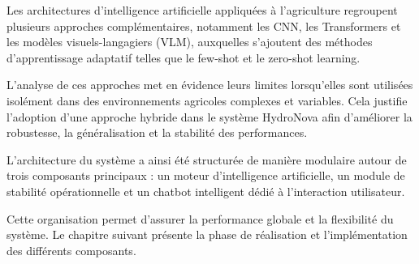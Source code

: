 Les architectures d’intelligence artificielle appliquées à l’agriculture regroupent plusieurs approches complémentaires, notamment les CNN, les Transformers et les modèles visuels-langagiers (VLM), auxquelles s’ajoutent des méthodes d’apprentissage adaptatif telles que le few-shot et le zero-shot learning.

L’analyse de ces approches met en évidence leurs limites lorsqu’elles sont utilisées isolément dans des environnements agricoles complexes et variables. Cela justifie l’adoption d’une approche hybride dans le système HydroNova afin d’améliorer la robustesse, la généralisation et la stabilité des performances.

L’architecture du système a ainsi été structurée de manière modulaire autour de trois composants principaux : un moteur d’intelligence artificielle, un module de stabilité opérationnelle et un chatbot intelligent dédié à l’interaction utilisateur.

Cette organisation permet d’assurer la performance globale et la flexibilité du système. Le chapitre suivant présente la phase de réalisation et l’implémentation des différents composants.